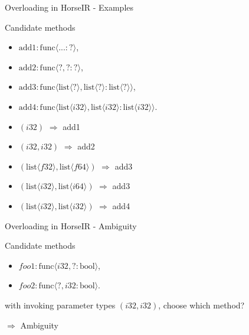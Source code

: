 \documentclass{beamer}
\begin{document}
\begin{frame}{Overloading in HorseIR - Examples}
\begin{block}{Candidate methods}
\begin{itemize}
    \item $\text{add1} : \text{func}\langle ... : ? \rangle $,
    \item $\text{add2} : \text{func}\langle ?, ? : ? \rangle$,
    \item $\text{add3} : \text{func}\langle \text{list} \langle ? \rangle,
           \text{list} \langle ? \rangle : \text{list} \langle ? \rangle
           \rangle$,
    \item $\text{add4} : \text{func}\langle \text{list} \langle i32 \rangle,
           \text{list} \langle i32 \rangle : \text{list} \langle i32 \rangle
           \rangle$.
\end{itemize}
\end{block}
\begin{itemize}
    \item $(i32)$ $\Rightarrow$ add1
    \item $(i32, i32)$ $\Rightarrow$ add2
    \item $(\text{list} \langle f32 \rangle, \text{list} \langle f64 \rangle)$
          $\Rightarrow$ add3
    \item $(\text{list} \langle i32 \rangle, \text{list} \langle i64 \rangle)$
          $\Rightarrow$ add3
    \item $(\text{list} \langle i32 \rangle, \text{list} \langle i32 \rangle)$
          $\Rightarrow$ add4
\end{itemize}
\end{frame}

\begin{frame}{Overloading in HorseIR - Ambiguity} 
\begin{block}{Candidate methods}
\begin{itemize}
    \item $foo1 : \text{func}\langle i32, ? : \text{bool} \rangle$,
    \item $foo2 : \text{func}\langle ?, i32 : \text{bool} \rangle$.
\end{itemize}
\end{block}  
with invoking parameter types $(i32, i32)$, choose which method?

$\Rightarrow$ Ambiguity
\end{frame}
\end{document}
